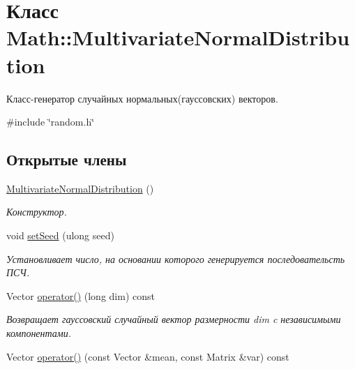 \hypertarget{class_math_1_1_multivariate_normal_distribution}{}\section{Класс Math\+:\+:Multivariate\+Normal\+Distribution}
\label{class_math_1_1_multivariate_normal_distribution}


Класс-\/генератор случайных нормальных(гауссовских) векторов.  




{\ttfamily \#include \char`\"{}random.\+h\char`\"{}}

\subsection*{Открытые члены}
\begin{DoxyCompactItemize}
\item 
\hypertarget{class_math_1_1_multivariate_normal_distribution_aa72eb69d327a37bf1a3066b26c665ef6}{}\label{class_math_1_1_multivariate_normal_distribution_aa72eb69d327a37bf1a3066b26c665ef6} 
\hyperlink{class_math_1_1_multivariate_normal_distribution_aa72eb69d327a37bf1a3066b26c665ef6}{Multivariate\+Normal\+Distribution} ()
\begin{DoxyCompactList}\small\item\em Конструктор. \end{DoxyCompactList}\item 
\hypertarget{class_math_1_1_multivariate_normal_distribution_a32af57a288a3e2f36a48f957c7cf5274}{}\label{class_math_1_1_multivariate_normal_distribution_a32af57a288a3e2f36a48f957c7cf5274} 
void \hyperlink{class_math_1_1_multivariate_normal_distribution_a32af57a288a3e2f36a48f957c7cf5274}{set\+Seed} (ulong seed)
\begin{DoxyCompactList}\small\item\em Установливает число, на основании которого генерируется последовательсть ПСЧ. \end{DoxyCompactList}\item 
\hypertarget{class_math_1_1_multivariate_normal_distribution_a1bb4c395fd64bf1ce393d8eaf3fb981b}{}\label{class_math_1_1_multivariate_normal_distribution_a1bb4c395fd64bf1ce393d8eaf3fb981b} 
Vector \hyperlink{class_math_1_1_multivariate_normal_distribution_a1bb4c395fd64bf1ce393d8eaf3fb981b}{operator()} (long dim) const
\begin{DoxyCompactList}\small\item\em Возвращает гауссовский случайный вектор размерности dim c независимыми компонентами. \end{DoxyCompactList}\item 
Vector \hyperlink{class_math_1_1_multivariate_normal_distribution_aeedc94bd79f9798ffedf86851b76de47}{operator()} (const Vector \&mean, const Matrix \&var) const
\end{DoxyCompactItemize}
